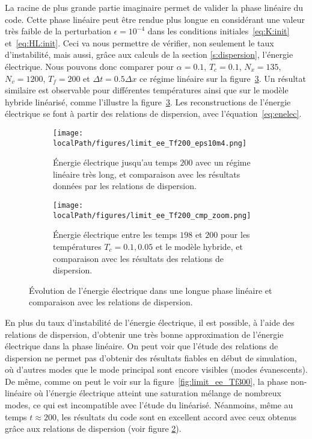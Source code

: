 La racine de plus grande partie imaginaire permet de valider la phase linéaire du code. Cette phase linéaire peut être rendue plus longue en considérant une valeur très faible de la perturbation $\epsilon=10^{-4}$ dans les conditions initiales~\eqref{eq:K:init} et~\eqref{eq:HL:init}. Ceci va nous permettre de vérifier, non seulement le taux d'instabilité, mais aussi, grâce aux calculs de la section \ref{s:dispersion}, l'énergie électrique. Nous pouvons donc comparer pour $\alpha = 0.1$, $T_c=0.1$, $N_x=135$, $N_v=1200$, $T_f=200$ et $\Delta t = 0.5\Delta x$ ce régime linéaire sur la figure~\ref{fig:limit:ee:Tf200}. Un résultat similaire est observable pour différentes températures ainsi que sur le modèle hybride linéarisé, comme l'illustre la figure~\ref{fig:limit:ee:Tf200}. Les reconstructions de l'énergie électrique se font à partir des relations de dispersion, avec l'équation~\eqref{eq:enelec}.
\begin{figure}
  \centering
  \begin{subfigure}{0.8\textwidth}
    \centering
    \texttt{[image: \\localPath/figures/limit\_ee\_Tf200\_eps10m4.png]}
    \caption{Énergie électrique jusqu'au temps $200$ avec un régime linéaire très long, et comparaison avec les résultats données par les relations de dispersion.}
    \label{fig:limit:ee:Tf200:eps10m4}
  \end{subfigure}
  \begin{subfigure}{0.8\textwidth}
    \centering
    \texttt{[image: \\localPath/figures/limit\_ee\_Tf200\_cmp\_zoom.png]}
    \caption{Énergie électrique entre les temps $198$ et $200$ pour les températures $T_c = 0.1,0.05$ et le modèle hybride, et comparaison avec les résultats des relations de dispersion.}
    \label{fig:limit:ee:Tf200:cmp_zoom}
  \end{subfigure}
  \caption{Évolution de l'énergie électrique dans une longue phase linéaire et comparaison avec les relations de dispersion.}
  \label{fig:limit:ee:Tf200}
\end{figure}

En plus du taux d'instabilité de l'énergie électrique, il est possible, à l'aide des relations de dispersion, d'obtenir une très bonne approximation de l'énergie électrique dans la phase linéaire. On peut voir que l'étude des relations de dispersion ne permet pas d'obtenir des résultats fiables en début de simulation, où d'autres modes que le mode principal sont encore visibles (modes évanescents). De même, comme on peut le voir sur la figure~\ref{fig:limit_ee_Tf300}, la phase non-linéaire où l'énergie électrique atteint une saturation mélange de nombreux modes, ce qui est incompatible avec l'étude du linéarisé. Néanmoins, même au temps $t\approx 200$, les résultats du code sont en excellent accord avec ceux obtenus grâce aux relations de dispersion  (voir figure \ref{fig:limit:ee:Tf200:cmp_zoom}). 

